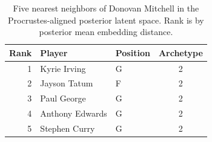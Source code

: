 \begin{table}[htbp]
  \centering\small
  \begin{tabular}{rllc}
    \toprule
    Rank & Player & Position & Archetype \\
    \midrule
    1 & Kyrie Irving & G & 2 \\
    2 & Jayson Tatum & F & 2 \\
    3 & Paul George & G & 2 \\
    4 & Anthony Edwards & G & 2 \\
    5 & Stephen Curry & G & 2 \\
    \bottomrule
  \end{tabular}
  \caption{Five nearest neighbors of Donovan Mitchell in the Procrustes-aligned posterior latent space. Rank is by posterior mean embedding distance.}
\end{table}

